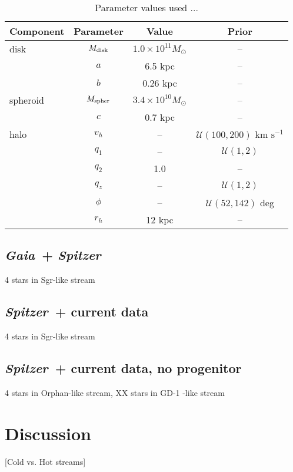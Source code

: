 \documentclass[letterpaper,12pt,preprint]{aastex}
\newcommand{\project}[1]{\textsl{#1}}
\newcommand{\gaia}{\project{Gaia}~}
\newcommand{\spitzer}{\project{Spitzer}~}
\begin{document}
\begin{table}[h]
\begin{center}
	\begin{tabular}{l c c c} \toprule
		{\bf Component} & {\bf Parameter} & {\bf Value} & {\bf Prior} \\\toprule
		disk & $M_{\rm disk}$ & $1.0\times10^{11}M_\odot$ & -- \\ 
		& $a$ & 6.5 kpc & --\\
		& $b$ & 0.26 kpc & --\\
		\midrule
		spheroid & $M_{\rm spher}$ & $3.4\times10^{10}M_\odot$ & --\\ 
		& $c$ & 0.7 kpc & --\\
		\midrule
		halo & $v_h$ & -- & $\mathcal{U}(100,200)$ km $\mathrm{s}^{-1}$ \\
		& $q_1$ & -- & $\mathcal{U}(1,2)$\\
		& $q_2$ & 1.0 & --\\
		& $q_z$ & -- & $\mathcal{U}(1,2)$\\
		& $\phi$ & -- & $\mathcal{U}(52,142)$ deg\\
		& $r_h$ & 12 kpc & --\\
		\bottomrule
		\hline
	\end{tabular}
	\caption{Parameter values used ...\label{tbl:potential}}
\end{center}
\end{table}

\subsection{\gaia + \spitzer}
4 stars in Sgr-like stream

\subsection{\spitzer + current data}
4 stars in Sgr-like stream

\subsection{\spitzer + current data, no progenitor}
4 stars in Orphan-like stream, XX stars in GD-1 -like stream

\section{Discussion}

[Cold vs. Hot streams]
\end{document}
